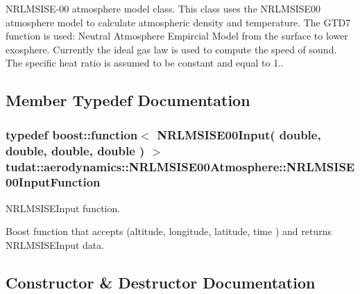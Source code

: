 N\+R\+L\+M\+S\+I\+S\+E-\/00 atmosphere model class. This class uses the N\+R\+L\+M\+S\+I\+S\+E00 atmosphere model to calculate atmospheric density and temperature. The G\+T\+D7 function is used\+: Neutral Atmosphere Empircial Model from the surface to lower exosphere. Currently the ideal gas law is used to compute the speed of sound. The specific heat ratio is assumed to be constant and equal to 1.. 

\subsection{Member Typedef Documentation}
\subsubsection[{\texorpdfstring{N\+R\+L\+M\+S\+I\+S\+E00\+Input\+Function}{NRLMSISE00InputFunction}}]{\setlength{\rightskip}{0pt plus 5cm}typedef boost\+::function$<$ {\bf N\+R\+L\+M\+S\+I\+S\+E00\+Input}( double, double, double, double ) $>$ {\bf tudat\+::aerodynamics\+::\+N\+R\+L\+M\+S\+I\+S\+E00\+Atmosphere\+::\+N\+R\+L\+M\+S\+I\+S\+E00\+Input\+Function}}\hypertarget{classtudat_1_1aerodynamics_1_1NRLMSISE00Atmosphere_aee0e57056d5fc68264773dd94b8b8f3b}{}\label{classtudat_1_1aerodynamics_1_1NRLMSISE00Atmosphere_aee0e57056d5fc68264773dd94b8b8f3b}


N\+R\+L\+M\+S\+I\+S\+E\+Input function. 

Boost function that accepts (altitude, longitude, latitude, time ) and returns N\+R\+L\+M\+S\+I\+S\+E\+Input data. 

\subsection{Constructor \& Destructor Documentation}
